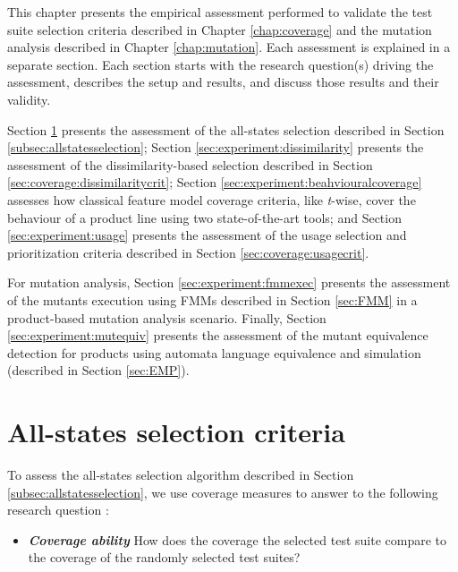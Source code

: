 

This chapter presents the empirical assessment performed to validate the test suite selection criteria described in Chapter \ref{chap:coverage} and the mutation analysis described in Chapter \ref{chap:mutation}. Each assessment is explained in a separate section. Each section starts with the research question(s) driving the assessment, describes the setup and results, and discuss those results and their validity. 

Section \ref{sec:experiment:allstates} presents the assessment of the all-states selection described in Section \ref{subsec:allstatesselection}; Section \ref{sec:experiment:dissimilarity} presents the assessment of the dissimilarity-based selection described in Section \ref{sec:coverage:dissimilaritycrit}; Section \ref{sec:experiment:beahviouralcoverage} assesses how classical feature model coverage criteria, like \textit{t}-wise, cover the behaviour of a product line using two state-of-the-art tools; and Section \ref{sec:experiment:usage} presents the assessment of the usage selection and prioritization criteria described in Section \ref{sec:coverage:usagecrit}. 

For mutation analysis, Section \ref{sec:experiment:fmmexec} presents the assessment of the mutants execution using \glspl{FMM} described in Section \ref{sec:FMM} in a product-based mutation analysis scenario. Finally, Section \ref{sec:experiment:mutequiv} presents the assessment of the mutant equivalence detection for products using automata language equivalence and simulation (described in Section \ref{sec:EMP}).



\section{All-states selection criteria}

\label{sec:experiment:allstates}

To assess the all-states selection algorithm described in Section \ref{subsec:allstatesselection}, we use coverage measures to answer to the following research question \cite{Devroey2014c}:
\begin{itemize}
\item \textbf{\textit{Coverage ability} } How does the coverage the selected test suite compare to the coverage of the randomly selected test suites?
\end{itemize}

